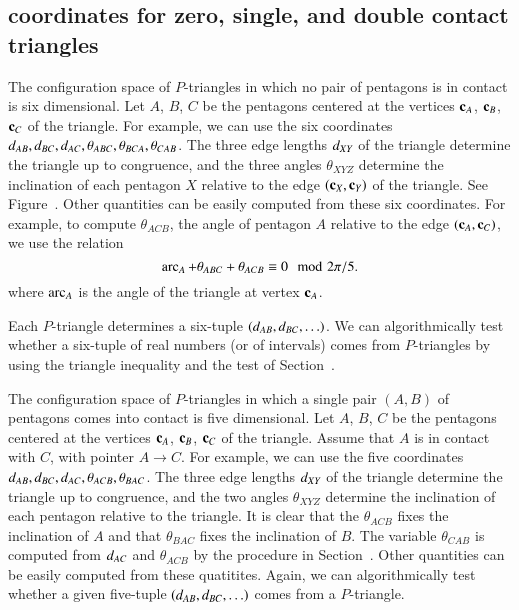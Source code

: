\subsection{coordinates for zero, single, and double contact
  triangles}

The configuration space of $P$-triangles in which no pair of pentagons
is in contact is six dimensional.  Let $A$, $B$, $C$ be the pentagons
centered at the vertices ${\mathbf c}_A$, ${\mathbf c}_B$, ${\mathbf c}_C$ of the triangle.  For
example, we can use the six coordinates
$d_{AB},d_{BC},d_{AC},\theta_{ABC},\theta_{BCA},\theta_{CAB}$.  The
three edge lengths $d_{XY}$ of the triangle determine the triangle up
to congruence, and the three angles $\theta_{XYZ}$ determine the
inclination of each pentagon $X$ relative to the edge $({\mathbf c}_X,{\mathbf c}_Y)$ of
the triangle.  See Figure~.  Other quantities can
be easily computed from these six coordinates.  For example, to
compute $\theta_{ACB}$, the angle of pentagon $A$ relative to the edge
$({\mathbf c}_A,{\mathbf c}_C)$, we use the relation
\[
\operatorname{arc}_A + \theta_{ABC} + \theta_{ACB} \equiv 0\mod 2\pi/5.
\]
where $\operatorname{arc}_A$ is the angle of the triangle at vertex ${\mathbf c}_A$.  


Each $P$-triangle determines a six-tuple $(d_{AB},d_{BC},\ldots)$.
We can algorithmically test whether a six-tuple of real numbers
(or of intervals)  comes from $P$-triangles by using the triangle
inequality and the test of Section~.

The configuration space of $P$-triangles in which a single pair
$(A,B)$ of pentagons comes into contact is five dimensional.  Let $A$,
$B$, $C$ be the pentagons centered at the vertices ${\mathbf c}_A$, ${\mathbf c}_B$,
${\mathbf c}_C$ of the triangle.  Assume that $A$ is in contact with $C$, with
pointer $A\to C$.  For example, we can use the five coordinates
$d_{AB},d_{BC},d_{AC},\theta_{ACB},\theta_{BAC}$.  The three edge
lengths $d_{XY}$ of the triangle determine the triangle up to
congruence, and the two angles $\theta_{XYZ}$ determine the
inclination of each pentagon relative to the triangle.  It is clear
that the $\theta_{ACB}$ fixes the inclination of $A$ and that
$\theta_{BAC}$ fixes the inclination of $B$.  The variable
$\theta_{CAB}$ is computed from $d_{AC}$ and $\theta_{ACB}$ by the
procedure in Section~.  Other quantities can be easily
computed from these quatitites. Again, we can algorithmically
test whether a given five-tuple $(d_{AB},d_{BC},\ldots)$ 
comes from a $P$-triangle.

